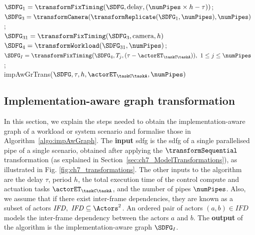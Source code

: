 \begin{algorithm}
\SetAlgoLined
{}
$\SDFG_{1}=\transformFixTiming(\SDFG,\text{delay},(\numPipes\times h-\tau))$;~\label{algoStep:G1}\\
$\SDFG_{3}=\transformCamera(\transformReplicate(\SDFG_{1},\numPipes),\numPipes)$;~\label{algoStep:G3}\\
$\SDFG_{31}=\transformFixTiming(\SDFG_{3},\text{camera},h)$~\label{algoStep:G31}\\
$\SDFG_{4}=\transformWorkload(\SDFG_{31},\numPipes)$;~\label{algoStep:G4}\\
$\SDFG_{I}=\transformFixTiming(\SDFG_{4},T_j,(\tau-\actorET_{{\taskC}{\taskA}})),\ 1\le j\le \numPipes$;~\label{algoStep:impAwGraph}\\
\caption{impAwGrTrans($\SDFG,\tau,h, \actorET_{{\taskC}{\taskA}},\numPipes)$}\label{algo:impAwGraph}
\end{algorithm}

\subsection{Implementation-aware graph transformation}
\label{sec:ch7_ImpAwGrTrans}
In this section, we explain the steps needed to obtain the implementation-aware graph of a workload or system scenario and formalise those in Algorithm~\ref{algo:impAwGraph}. The \textbf{input} \gls{sdfg} is the \gls{sdfg} of a single parallelised pipe of a single scenario, obtained after applying the $\transformSequential$ transformation (as explained in Section~\ref{sec:ch7_ModelTransformations}), as illustrated in Fig. \ref{fig:ch7_transformations}.
The other inputs to the algorithm are the delay $\tau$, period $h$, the total execution time of the control compute and actuation tasks $\actorET_{{\taskC}{\taskA}}$, and the number of pipes $\numPipes$.
Also, we assume that if there exist inter-frame dependencies, they are known as a subset of actors $\mathit{IFD},\ \mathit{IFD} \subseteq \Actors^2$.
An ordered pair of actors $(a,b)\in \mathit{IFD}$ models the inter-frame dependency between the actors $a$ and $b$.
The \textbf{output} of the algorithm is the implementation-aware graph $\SDFG_I$.

